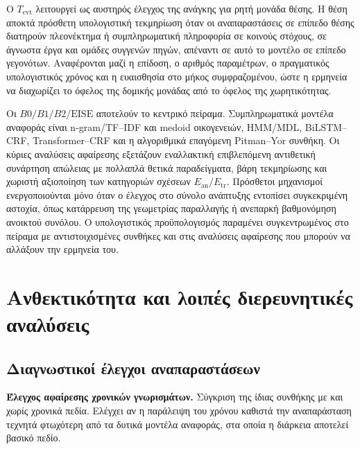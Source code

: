 \documentclass[11pt,a4paper]{article}
\begin{document}
Ο $T_{\mathrm{evt}}$ λειτουργεί ως αυστηρός έλεγχος της ανάγκης για ρητή μονάδα θέσης. Η θέση αποκτά πρόσθετη υπολογιστική τεκμηρίωση όταν οι αναπαραστάσεις σε επίπεδο θέσης διατηρούν πλεονέκτημα ή συμπληρωματική πληροφορία σε κοινούς στόχους, σε άγνωστα έργα και ομάδες συγγενών πηγών, απέναντι σε αυτό το μοντέλο σε επίπεδο γεγονότων. Αναφέρονται μαζί η επίδοση, ο αριθμός παραμέτρων, ο πραγματικός υπολογιστικός χρόνος και η ευαισθησία στο μήκος συμφραζομένου, ώστε η ερμηνεία να διαχωρίζει το όφελος της δομικής μονάδας από το όφελος της χωρητικότητας.


Οι $B0/B1/B2/\mathrm{EISE}$ αποτελούν το κεντρικό πείραμα. Συμπληρωματικά μοντέλα αναφοράς είναι n-gram/TF--IDF και medoid οικογενειών, HMM/MDL, BiLSTM--CRF, Transformer--CRF και η αλγοριθμικά επαγόμενη Pitman--Yor συνθήκη. Οι κύριες αναλύσεις αφαίρεσης εξετάζουν εναλλακτική επιβλεπόμενη αντιθετική συνάρτηση απώλειας με πολλαπλά θετικά παραδείγματα, βάρη τεκμηρίωσης και χωριστή αξιοποίηση των κατηγοριών σχέσεων $E_{\mathrm{an}}/E_{\mathrm{tr}}$. Πρόσθετοι μηχανισμοί ενεργοποιούνται μόνο όταν ο έλεγχος στο σύνολο ανάπτυξης εντοπίσει συγκεκριμένη αστοχία, όπως κατάρρευση της γεωμετρίας παραλλαγής ή ανεπαρκή βαθμονόμηση ανοικτού συνόλου. Ο υπολογιστικός προϋπολογισμός παραμένει συγκεντρωμένος στο πείραμα με αντιστοιχισμένες συνθήκες και στις αναλύσεις αφαίρεσης που μπορούν να αλλάξουν την ερμηνεία του.


\section{Ανθεκτικότητα και λοιπές διερευνητικές αναλύσεις}\label{app:robust}

\subsection{Διαγνωστικοί έλεγχοι αναπαραστάσεων}\label{app:robust-repr}

\textbf{Έλεγχος αφαίρεσης χρονικών γνωρισμάτων.} Σύγκριση της ίδιας συνθήκης με και χωρίς χρονικά πεδία. Ελέγχει αν η παράλειψη του χρόνου καθιστά την αναπαράσταση τεχνητά φτωχότερη από τα δυτικά μοντέλα αναφοράς, στα οποία η διάρκεια αποτελεί βασικό πεδίο.
\end{document}
